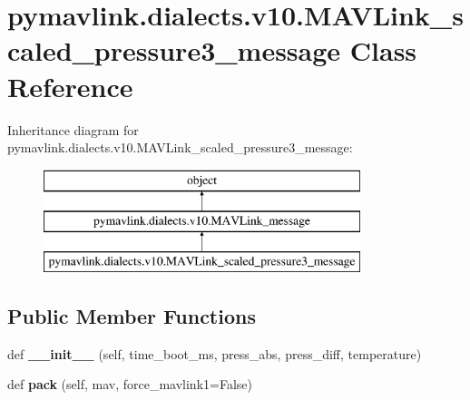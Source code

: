 \hypertarget{classpymavlink_1_1dialects_1_1v10_1_1MAVLink__scaled__pressure3__message}{}\section{pymavlink.\+dialects.\+v10.\+M\+A\+V\+Link\+\_\+scaled\+\_\+pressure3\+\_\+message Class Reference}
\label{classpymavlink_1_1dialects_1_1v10_1_1MAVLink__scaled__pressure3__message}
Inheritance diagram for pymavlink.\+dialects.\+v10.\+M\+A\+V\+Link\+\_\+scaled\+\_\+pressure3\+\_\+message\+:\begin{figure}[H]
\begin{center}
\leavevmode
\includegraphics[height=3.000000cm]{classpymavlink_1_1dialects_1_1v10_1_1MAVLink__scaled__pressure3__message}
\end{center}
\end{figure}
\subsection*{Public Member Functions}
\begin{DoxyCompactItemize}
\item 
\mbox{\label{classpymavlink_1_1dialects_1_1v10_1_1MAVLink__scaled__pressure3__message_a25022d12f5444de51de4b4fc40a7c2d5}} 
def {\bfseries \+\_\+\+\_\+init\+\_\+\+\_\+} (self, time\+\_\+boot\+\_\+ms, press\+\_\+abs, press\+\_\+diff, temperature)
\item 
\mbox{\label{classpymavlink_1_1dialects_1_1v10_1_1MAVLink__scaled__pressure3__message_a7cd7d2aa9ff8cdf3271ea8228401ce2e}} 
def {\bfseries pack} (self, mav, force\+\_\+mavlink1=False)
\end{DoxyCompactItemize}
